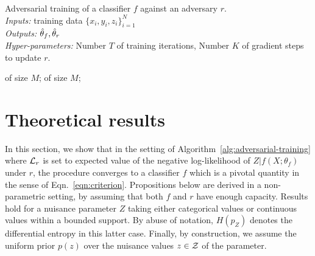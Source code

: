 \documentclass{article}
\theoremstyle{plain}
\begin{document}
\begin{algorithm}[t]
\caption{Adversarial training of a classifier $f$ against an adversary $r$.\\
{\it Inputs:} training data $\{ x_i, y_i, z_i \}_{i=1}^N$\\
{\it Outputs:} $\smash{\hat\theta_f}, \smash{\hat\theta_r}$\\
{\it Hyper-parameters:} Number $T$ of training iterations, Number $K$ of gradient steps to update $r$.}
\label{alg:adversarial-training}
\begin{algorithmic}[1]
         
             of size $M$;
        \EndFor
         of size $M$; 
    \EndFor
\end{algorithmic}
\end{algorithm}



\section{Theoretical results}
\label{sec:theory}

In this section, we show that in the setting of
Algorithm~\ref{alg:adversarial-training} where ${\cal L}_r$ is set to expected
value of the negative log-likelihood of $Z|f(X;\theta_f)$ under $r$, the
procedure converges to a classifier $f$ which is a pivotal quantity in the sense
of Eqn.~\ref{eqn:criterion}. Propositions below are derived in a non-parametric
setting, by assuming that both $f$ and $r$ have enough capacity. Results hold
for a nuisance parameter $Z$ taking either categorical values or continuous values within a
bounded support.  By abuse of notation, $H(p_Z)$ denotes the differential
entropy in this latter case. Finally, by construction, we assume the uniform
prior $p(z)$ over the nuisance values $z \in {\cal Z}$ of the parameter.
\end{document}
